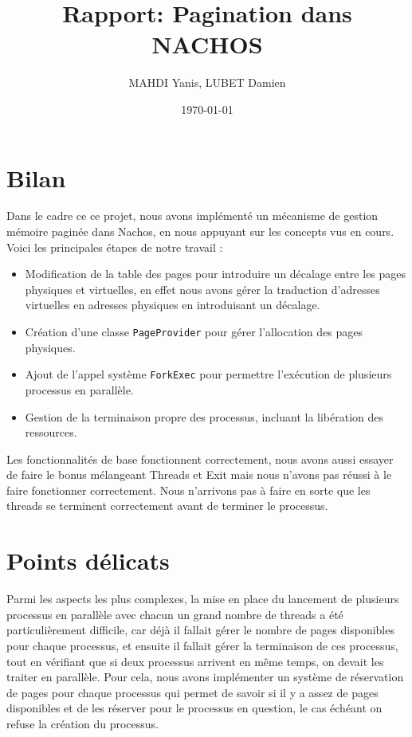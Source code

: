 \documentclass[a4paper,11pt]{article}
\title{Rapport: Pagination dans NACHOS}
\author{MAHDI Yanis, LUBET Damien}
\date{\today}
\begin{document}
\maketitle
\tableofcontents

\section{Bilan}
Dans le cadre ce ce projet, nous avons implémenté un mécanisme de gestion mémoire paginée dans Nachos, en nous appuyant sur les concepts vus en cours. Voici les principales étapes de notre travail :
\begin{itemize}
    \item Modification de la table des pages pour introduire un décalage entre les pages physiques et virtuelles, en effet nous avons gérer la traduction d'adresses virtuelles en adresses physiques en introduisant un décalage.
    \item Création d’une classe \texttt{PageProvider} pour gérer l’allocation des pages physiques.
    \item Ajout de l’appel système \texttt{ForkExec} pour permettre l’exécution de plusieurs processus en parallèle.
    \item Gestion de la terminaison propre des processus, incluant la libération des ressources.
\end{itemize}
Les fonctionnalités de base fonctionnent correctement, nous avons aussi essayer de faire le bonus mélangeant Threads et Exit mais nous n'avons pas réussi à le faire fonctionner correctement. Nous n'arrivons pas à faire en sorte que les threads se terminent correctement avant de terminer le processus.

\section{Points délicats}
Parmi les aspects les plus complexes, la mise en place du lancement de plusieurs processus en parallèle avec chacun un grand nombre de threads a été particulièrement difficile,
car déjà il fallait gérer le nombre de pages disponibles pour chaque processus, et ensuite il fallait gérer la terminaison de ces processus, tout en vérifiant que si deux processus arrivent en même temps, on devait les traiter en parallèle. 
Pour cela, nous avons implémenter un système de réservation de pages pour chaque processus qui permet de savoir si il y a assez de pages disponibles et de les réserver pour le processus en question, le cas échéant on refuse la création du processus.
\end{document}
